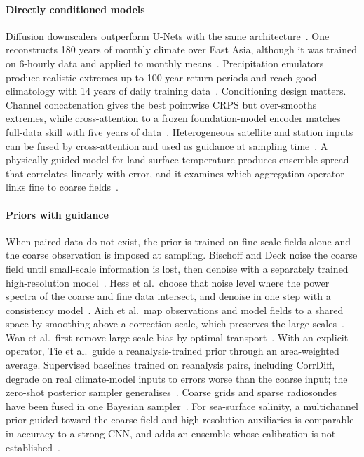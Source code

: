 \paragraph{Directly conditioned models} Diffusion downscalers outperform U-Nets with the same architecture~\cite{watt2024diffdownscaling}. One reconstructs 180 years of monthly climate over East Asia, although it was trained on 6-hourly data and applied to monthly means~\cite{ling2024dpdm}. Precipitation emulators produce realistic extremes up to 100-year return periods and reach good climatology with 14 years of daily training data~\cite{addison2026cpmgem}. Conditioning design matters. Channel concatenation gives the best pointwise CRPS but over-smooths extremes, while cross-attention to a frozen foundation-model encoder matches full-data skill with five years of data~\cite{ribeiro2026prithvi}. Heterogeneous satellite and station inputs can be fused by cross-attention and used as guidance at sampling time~\cite{tu2025mods}. A physically guided model for land-surface temperature produces ensemble spread that correlates linearly with error, and it examines which aggregation operator links fine to coarse fields~\cite{zhang2025pgdm}.

\paragraph{Priors with guidance} When paired data do not exist, the prior is trained on fine-scale fields alone and the coarse observation is imposed at sampling. Bischoff and Deck noise the coarse field until small-scale information is lost, then denoise with a separately trained high-resolution model~\cite{bischoff2024bridges}. Hess et al.\ choose that noise level where the power spectra of the coarse and fine data intersect, and denoise in one step with a consistency model~\cite{hess2025scaleadaptive}. Aich et al.\ map observations and model fields to a shared space by smoothing above a correction scale, which preserves the large scales~\cite{aich2026conddiff}. Wan et al.\ first remove large-scale bias by optimal transport~\cite{wan2023debias}. With an explicit operator, Tie et al.\ guide a reanalysis-trained prior through an area-weighted average. Supervised baselines trained on reanalysis pairs, including CorrDiff, degrade on real climate-model inputs to errors worse than the coarse input; the zero-shot posterior sampler generalises~\cite{tie2026zssd}. Coarse grids and sparse radiosondes have been fused in one Bayesian sampler~\cite{chakraborty2025multimodal}. For sea-surface salinity, a multichannel prior guided toward the coarse field and high-resolution auxiliaries is comparable in accuracy to a strong CNN, and adds an ensemble whose calibration is not established~\cite{forestier2026sss}.

